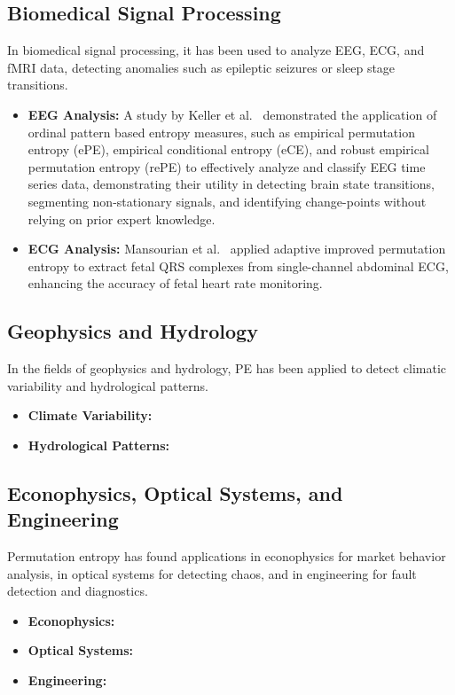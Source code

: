 \subsection{Biomedical Signal Processing}
In biomedical signal processing, it has been used to analyze EEG, ECG, and fMRI data, detecting anomalies such as epileptic seizures or sleep stage transitions. 
\begin{itemize}
	\item \textbf{EEG Analysis:} A study by Keller et al.~\cite{Keller2014} demonstrated the application of ordinal pattern based entropy measures, such as empirical permutation entropy (ePE), empirical conditional entropy (eCE), and robust empirical permutation entropy (rePE) to effectively analyze and classify EEG time series data, demonstrating their utility in detecting brain state transitions, segmenting non-stationary signals, and identifying change-points without relying on prior expert knowledge.
	
	\item \textbf{ECG Analysis:} Mansourian et al.~\cite{Mansourian2024} applied adaptive improved permutation entropy to extract fetal QRS complexes from single-channel abdominal ECG, enhancing the accuracy of fetal heart rate monitoring.
\end{itemize}

\subsection{Geophysics and Hydrology}
In the fields of geophysics and hydrology, PE has been applied to detect climatic variability and hydrological patterns.
\begin{itemize}
	\item \textbf{Climate Variability:}
	
	\item \textbf{Hydrological Patterns:}
\end{itemize}

\subsection{Econophysics, Optical Systems, and Engineering}
Permutation entropy has found applications in econophysics for market behavior analysis, in optical systems for detecting chaos, and in engineering for fault detection and diagnostics.
\begin{itemize}
	\item \textbf{Econophysics:}
	
	\item \textbf{Optical Systems:}
	
	\item \textbf{Engineering:}
\end{itemize}

